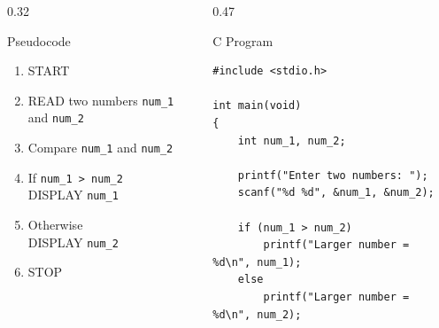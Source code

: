 \documentclass[aspectratio=169]{beamer}
\begin{document}
	\begin{frame}{}
		
		\vspace*{-0.30cm}
		
		\begin{columns}[T,onlytextwidth]
			
			
			\begin{column}{0.32\textwidth}
				
				\begin{block}{Pseudocode}
					\scriptsize
					\begin{enumerate}\small
						\item START
						\item READ two numbers \texttt{num\_1} and \texttt{num\_2}
						\item Compare \texttt{num\_1} and \texttt{num\_2}
						\item If \texttt{num\_1 > num\_2}\\
						\qquad DISPLAY \texttt{num\_1}
						\item Otherwise\\
						\qquad DISPLAY \texttt{num\_2}
						\item STOP
					\end{enumerate}
				\end{block}
				
			\end{column}
			
			
			\hspace*{0.3cm}
			\begin{column}{0.47\textwidth}
				
				\begin{block}{C Program}
					
\begin{lstlisting}[style=cstyle,numbers=none]
#include <stdio.h>

int main(void)
{
	int num_1, num_2;
	
	printf("Enter two numbers: ");
	scanf("%d %d", &num_1, &num_2);
	
	if (num_1 > num_2)
		printf("Larger number = %d\n", num_1);
	else
		printf("Larger number = %d\n", num_2);
	

\end{lstlisting}
\end{block}
\end{column}
\end{columns}
\end{frame}
\end{document}
